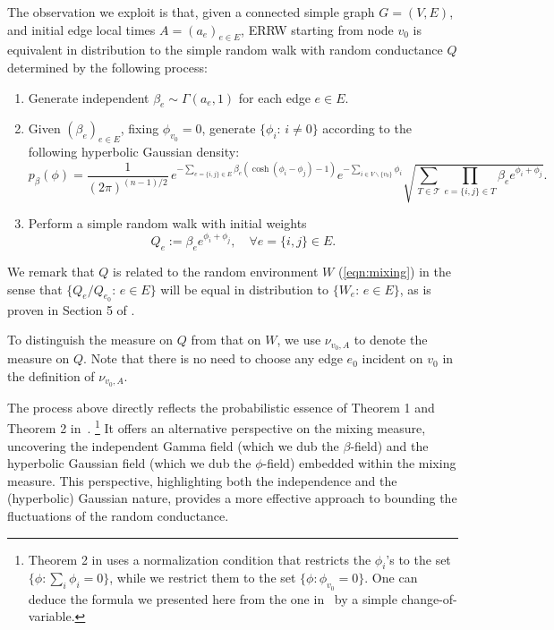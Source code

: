 \documentclass[a4paper, 11pt]{article}
\begin{document}
The observation we exploit is that, given a connected simple graph $G=(V, E)$, and initial edge local times $A=(a_e)_{e\in E}$, ERRW starting from node $v_0$ is equivalent in distribution to the simple random walk with random conductance $Q$ determined by the following process:
\begin{enumerate}
    \item Generate independent 
    \(
    \beta_e\sim\Gamma(a_e, 1)
    \)
    for each edge $e\in E$.
    \item Given $(\beta_e)_{e\in E}$, fixing $\phi_{v_0}=0$, generate $\{\phi_i:\,i\neq 0\}$ according to the following hyperbolic Gaussian density:
    \begin{equation*}
        p_\beta(\phi)=\frac{1}{(2\pi)^{(n-1)/2}}\,e^{-\sum_{e = \{i,j\} \in E}\beta_e(\cosh(\phi_i-\phi_j)-1)}e^{-\sum_{i\in V\backslash \{v_0\} }\phi_i} \sqrt{\sum_{T\in\mathcal{T}}\prod_{e = \{i,j\} \in T}\beta_e e^{\phi_i+\phi_j}}.
    \end{equation*}
    \item Perform a simple random walk with initial weights 
    \[Q_e:=\beta_e e^{\phi_i+\phi_j},\quad \forall e = \{i,j\} \in E.\] 
\end{enumerate}
We remark that $Q$ is related to the random environment $W$ (\cref{eqn:mixing}) in the sense that $\{Q_e/Q_{e_0}:\,e\in E\}$ will be equal in distribution to $\{W_e:\,e\in E\}$, as is proven in Section 5 of \cite{st}. 

To distinguish the measure on $Q$ from that on $W$, we use $\nu_{v_0, A}$ to denote the measure on $Q$. Note that there is no need to choose any edge $e_0$ incident on $v_0$ in the definition of $\nu_{v_0, A}$.

The process above directly reflects the probabilistic essence of Theorem 1 and Theorem 2 in~\cite{st}.
\footnote{Theorem 2 in \cite{st} uses a normalization condition that restricts the $\phi_i$'s to the set $\{\phi:\sum_{i}\phi_i=0\}$, while we restrict them to  the set $\{\phi:\phi_{v_0}=0\}$. One can deduce the formula we presented here from the one in~\cite{st}
by a simple change-of-variable. 
} It offers an alternative perspective on the mixing measure, uncovering the independent Gamma field (which we dub the $\beta$-field) and the hyperbolic Gaussian field (which we dub the $\phi$-field) embedded within the mixing measure. This perspective, highlighting both the independence and the (hyperbolic) Gaussian nature, provides a more effective approach to bounding the fluctuations of the random conductance.
\end{document}
